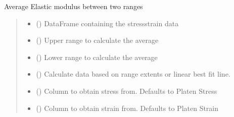 \documentclass[letterpaper,10pt,english]{sphinxmanual}
\begin{document}
\begin{fulllineitems}
\begin{fulllineitems}
\label{\detokenize{openfdem:openfdem.openfdem.Model.Eavg_mod}}
\pysigstartsignatures
{}
\pysigstopsignatures
\sphinxAtStartPar
Average Elastic modulus between two ranges
\begin{quote}\begin{description}
\begin{itemize}
\item {} 
\sphinxAtStartPar
{} () \textendash{} DataFrame containing the stress\sphinxhyphen{}strain data

\item {} 
\sphinxAtStartPar
{} () \textendash{} Upper range to calculate the average

\item {} 
\sphinxAtStartPar
{} () \textendash{} Lower range to calculate the average

\item {} 
\sphinxAtStartPar
{} () \textendash{} Calculate data based on range extents or linear best fit line.

\item {} 
\sphinxAtStartPar
{} () \textendash{} Column to obtain stress from. Defaults to Platen Stress

\item {} 
\sphinxAtStartPar
{} () \textendash{} Column to obtain strain from. Defaults to Platen Strain


\end{itemize}
\end{description}
\end{quote}
\end{fulllineitems}
\end{fulllineitems}
\end{document}
